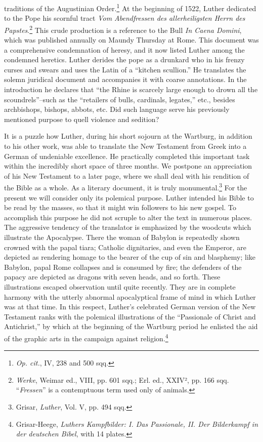 traditions of the Augustinian Order.\footnote{\textit{Op. cit.}, IV, 238 and 500 sqq.}
At the beginning of 1522, Luther dedicated to the Pope his scornful tract
\textit{Vom Abendfressen des allerheiligsten Herrn des Papstes}.\footnote
{\textit{Werke}, Weimar ed., VIII, pp. 601 sqq.; Erl. ed., XXIV², pp. 166 sqq. “\textit{Fressen}” is a
contemptuous term used only of animals.}
This crude production is a reference to the Bull \textit{In Caena Domini},
which was published annually on Maundy Thursday at Rome. This
document was a comprehensive condemnation of heresy, and it now
listed Luther among the condemned heretics. Luther derides the
pope as a drunkard who in his frenzy curses and swears and uses the
Latin of a “kitchen scullion.” He translates the solemn juridical document
and accompanies it with coarse annotations. In the introduction
he declares that “the Rhine is scarcely large enough to drown all
the scoundrels”--such as the “retailers of bulls, cardinals, legates,”
etc., besides archbishops, bishops, abbots, etc. Did such language serve
his previously mentioned purpose to quell violence and sedition?

It is a puzzle how Luther, during his short sojourn at the Wartburg, in
addition to his other work, was able to translate the New
Testament from Greek into a German of undeniable excellence. He
practically completed this important task within the incredibly short
space of three months. We postpone an appreciation of his New Testament
to a later page, where we shall deal with his rendition of the
Bible as a whole. As a literary document, it is truly monumental.\footnote{Grisar, \textit{Luther}, Vol. V, pp. 494 sqq.}
For the present we will consider only its polemical purpose. Luther
intended his Bible to be read by the masses, so that it might win followers
to his new gospel. To accomplish this purpose he did not
scruple to alter the text in numerous places. The aggressive tendency
of the translator is emphasized by the woodcuts which illustrate
the Apocalypse. There the woman of Babylon is repeatedly shown
crowned with the papal tiara; Catholic dignitaries, and even the Emperor,
are depicted as rendering homage to the bearer of the cup of
sin and blasphemy; like Babylon, papal Rome collapses and is consumed by
fire; the defenders of the papacy are depicted as dragons with
seven heads, and so forth. These illustrations escaped observation until
quite recently. They are in complete harmony with the utterly abnormal
apocalyptical frame of mind in which Luther was at that
time. In this respect, Luther’s celebrated German version of the New
Testament ranks with the polemical illustrations of the “Passionale
of Christ and Antichrist,” by which at the beginning of the Wartburg period
he enlisted the aid of the graphic arts in the campaign
against religion.\footnote
{Grisar-Heege, \textit{Luthers Kampfbilder: I. Das Passionale, II. Der Bilderkampf in der
deutschen Bibel}, with 14 plates.}

